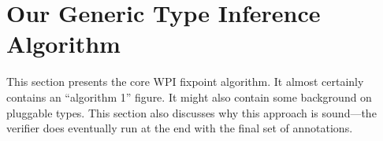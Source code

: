 \section{Our Generic Type Inference Algorithm}
\label{sec:core-algorithm}

This section presents the core WPI fixpoint algorithm. It almost
certainly contains an ``algorithm 1'' figure. It might also contain
some background on pluggable types. This section also discusses why
this approach is sound---the verifier does eventually run at the end
with the final set of annotations.
